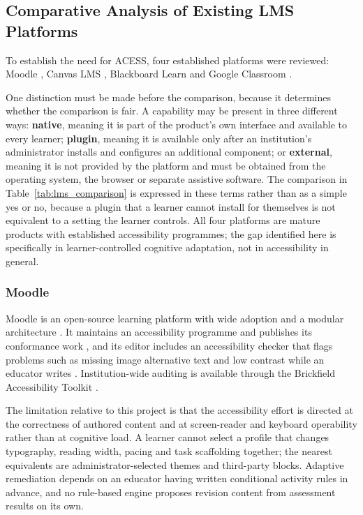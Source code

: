 \documentclass[12pt, oneside]{article} %
\begin{document}
\subsection{Comparative Analysis of Existing LMS Platforms}

To establish the need for ACESS, four established platforms were reviewed: Moodle \cite{moodle_software}, Canvas LMS \cite{canvas_lms}, Blackboard Learn \cite{blackboard_learn} and Google Classroom \cite{google_classroom}.

One distinction must be made before the comparison, because it determines whether the comparison is fair. A capability may be present in three different ways: \textbf{native}, meaning it is part of the product's own interface and available to every learner; \textbf{plugin}, meaning it is available only after an institution's administrator installs and configures an additional component; or \textbf{external}, meaning it is not provided by the platform and must be obtained from the operating system, the browser or separate assistive software. The comparison in Table~\ref{tab:lms_comparison} is expressed in these terms rather than as a simple yes or no, because a plugin that a learner cannot install for themselves is not equivalent to a setting the learner controls. All four platforms are mature products with established accessibility programmes; the gap identified here is specifically in learner-controlled cognitive adaptation, not in accessibility in general.

\subsubsection{Moodle}
Moodle is an open-source learning platform with wide adoption and a modular architecture \cite{moodle_architecture}. It maintains an accessibility programme and publishes its conformance work \cite{moodle_accessibility}, and its editor includes an accessibility checker that flags problems such as missing image alternative text and low contrast while an educator writes \cite{moodle_atto_a11y}. Institution-wide auditing is available through the Brickfield Accessibility Toolkit \cite{moodle_accessibility_toolkit}.

The limitation relative to this project is that the accessibility effort is directed at the correctness of authored content and at screen-reader and keyboard operability rather than at cognitive load. A learner cannot select a profile that changes typography, reading width, pacing and task scaffolding together; the nearest equivalents are administrator-selected themes and third-party blocks. Adaptive remediation depends on an educator having written conditional activity rules in advance, and no rule-based engine proposes revision content from assessment results on its own.
\end{document}
